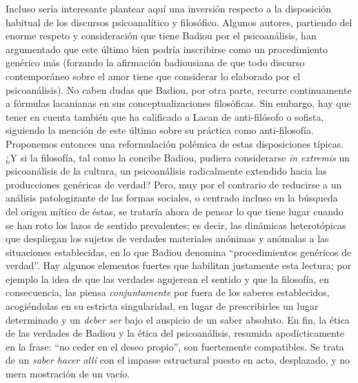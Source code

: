 Incluso sería interesante plantear aquí una inversión respecto a la disposición habitual de los discursos psicoanalítico y filosófico. Algunos autores, partiendo del enorme respeto y consideración que tiene Badiou por el psicoanálisis, han argumentado que este último bien podría inscribirse como un procedimiento genérico más (forzando la afirmación badiousiana de que todo discurso contemporáneo sobre el amor tiene que considerar lo elaborado por el psicoanálisis). No caben dudas que Badiou, por otra parte, recurre continuamente a fórmulas lacanianas en sus conceptualizaciones filosóficas. Sin embargo, hay que tener en cuenta también que ha calificado a Lacan de anti-filósofo o sofista, siguiendo la mención de este último sobre su práctica como anti-filosofía. Proponemos entonces una reformulación polémica de estas disposiciones típicas. ¿Y si la filosofía, tal como la concibe Badiou, pudiera considerarse \emph{in extremis} un psicoanálisis de la cultura, un psicoanálisis radicalmente extendido hacia las producciones genéricas de verdad? Pero, muy por el contrario de reducirse a un análisis patologizante de las formas sociales, o centrado incluso en la búsqueda del origen mítico de éstas, se trataría ahora de pensar lo que tiene lugar cuando se han roto los lazos de sentido prevalentes; es decir, las dinámicas heterotópicas que despliegan los sujetos de verdades materiales anónimas y anómalas a las situaciones establecidas, en lo que Badiou denomina \enquote{procedimientos genéricos de verdad}. Hay algunos elementos fuertes que habilitan justamente esta lectura; por ejemplo la idea de que las verdades agujerean el sentido y que la filosofía, en consecuencia, las piensa \emph{conjuntamente} por fuera de los saberes establecidos, acogiéndolas en su estricta singularidad, en lugar de prescribirles un lugar determinado y un \emph{deber ser} bajo el auspicio de un saber absoluto. En fin, la ética de las verdades de Badiou y la ética del psicoanálisis, resumida apodícticamente en la frase: \enquote{no ceder en el deseo propio}, son fuertemente compatibles. Se trata de un \emph{saber hacer allí} con el impasse estructural puesto en acto, desplazado, y no mera mostración de un vacío.

